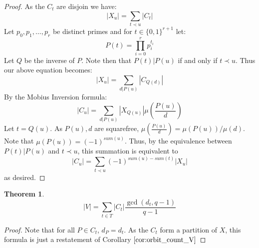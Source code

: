 \documentclass{article}
\newtheorem{theorem}{Theorem}[section]
\theoremstyle{definition}
\theoremstyle{definition}
\theoremstyle{remark}
\begin{document}
\begin{proof}
As the $C_t$ are disjoin we have:
\[|X_u| = \sum_{t \prec u} |C_t|\]
Let $p_0, p_1, \ldots, p_r$ be distinct primes and for $t \in \{0,1\}^{r+1}$ let:
\[P(t) = \prod_{i = 0}^r p_i^{t_i}\]
Let $Q$ be the inverse of $P$. Note then that $P(t) | P(u)$ if and only if $t \prec u$. Thus our above equation becomes:
\[|X_u| = \sum_{d | P(u)} |C_{Q(d)}|\]
By the Mobius Inversion formula:
\[|C_u| = \sum_{d | P(u)} |X_{Q(u)}| \mu\left(\frac{P(u)}{d}\right)\]
Let $t = Q(u)$. As $P(u), d$ are squarefree, $\mu\left(\frac{P(u)}{d}\right) = \mu(P(u))/\mu(d)$. Note that $\mu(P(u)) = (-1)^{sum(u)}$. Thus, by the equivalence between $P(t) | P(u)$ and $t \prec u$, this summation is equivalent to 
\[|C_u| = \sum_{t \prec u} (-1)^{sum(u) - sum(t)} |X_u|\]
as desired.
\end{proof}
\begin{theorem}
\label{V_formula}
\[|V| = \sum_{t \in T} |C_t| \frac{\gcd(d_t, q - 1)}{q - 1}\]
\end{theorem}
\begin{proof}
Note that for all $P \in C_t$, $d_P = d_t$. As the $C_t$ form a partition of $X$, this formula is just a restatement of Corollary $\ref{cor:orbit_count_V}$
\end{proof}
\end{document}
